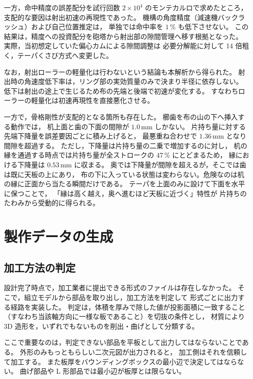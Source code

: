 \documentclass[a4paper,10pt,twocolumn]{ltjsarticle}
\newcommand{\mm}{\ensuremath{\,\mathrm{mm}}}
\begin{document}
一方，命中精度の誤差配分を試行回数 $2\times10^4$ のモンテカルロで求めたところ，
支配的な要因は射出初速の再現性であった。
機構の角度精度（減速機バックラッシュ）および自己位置推定は，
単独では命中率を $1\,\%$ も低下させない。
この結果は，精度への投資配分を砲塔から射出部の隙間管理へ移す根拠となった。
実際，当初想定していた偏心カムによる隙間調整は
必要分解能に対して 14 倍粗く，テーパくさび方式へ変更した。

なお，射出ローラーの軽量化は行わないという結論も本解析から得られた。
射出時の角速度低下率は，リング部の実効質量のみで決まり半径に依存しない。
低下は射出の途上で生じるため布の先端と後端で初速が変化する。
すなわちローラーの軽量化は初速再現性を直接悪化させる。

一方で，骨格剛性が支配的となる箇所も存在した。
櫛歯を布の山の下へ挿入する動作では，
机上面と歯の下面の間隙が $1.0\mm$ しかない。
片持ち量に対する先端下降量を誤差要因ごとに積み上げると，
最悪重ね合わせで $1.36\mm$ となり間隙を超過する。
ただし，下降量は片持ち量の二乗で増加するのに対し，
机の縁を通過する時点では片持ち量が全ストロークの $47\,\%$ にとどまるため，
縁における下降量は $0.53\mm$ に収まる。
奥では下降量が間隙を超えるが，そこでは歯は既に天板の上にあり，
布の下に入っている状態は変わらない。危険なのは机の縁に正面から当たる瞬間だけである。
テーパを上面のみに設けて下面を水平に保つことで，
「縁は高く越え，奥へ進むほど天板に近づく」特性が
片持ちのたわみから受動的に得られる。

\section{製作データの生成}

\subsection{加工方法の判定}

設計完了時点で，加工業者に提出できる形式のファイルは存在しなかった。
そこで，組立モデルから部品を取り出し，加工方法を判定して
形式ごとに出力する経路を実装した。
判定は，体積を厚みで除した値が投影面積に一致すること
（すなわち当該軸方向に一様な板であること）を切抜の条件とし，
材質により 3D 造形を，いずれでもないものを削出・曲げとして分類する。

ここで重要なのは，判定できない部品を平板として出力してはならないことである。
外形のみもっともらしい二次元図が出力されると，
加工側はそれを信頼して加工する。
また板厚をバウンディングボックスの最小辺で決定してはならない。
曲げ部品や L 形部品では最小辺が板厚とは限らない。
\end{document}
